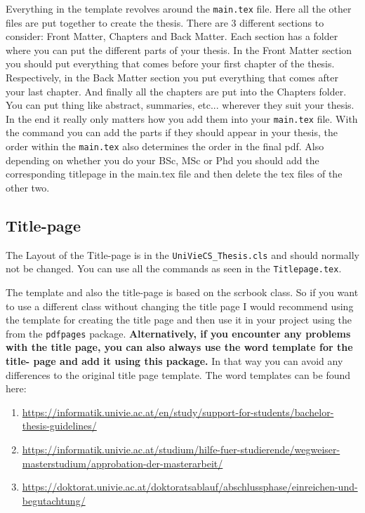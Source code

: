 Everything in the template revolves around the \verb|main.tex| file. Here all the other files are put together to create the thesis.
There are 3 different sections to consider: Front Matter, Chapters and Back Matter. Each section has a folder where you can put the different parts of your thesis. In the Front Matter section you should put everything that comes before your first chapter of the thesis. Respectively, in the Back Matter section you put everything that comes after your last chapter. And finally all the chapters are put into the Chapters folder. You can put thing like abstract, summaries, etc... wherever they suit your thesis. In the end it really only matters how you add them into your \verb|main.tex| file. With the \verb|| command you can add the parts if they should appear in your thesis, the order within the \verb|main.tex| also determines the order in the final pdf. Also depending on whether you do your BSc, MSc or Phd you should add the corresponding titlepage in the main.tex file and then delete the tex files of the other two.

\subsection{Title-page}
The Layout of the Title-page is in the \verb|UniVieCS_Thesis.cls| and should normally not be changed. You can use all the commands as seen in the \verb|Titlepage.tex|. 

The template and also the title-page is based on the scrbook class. So if you want to use a different class without changing the title page I would recommend using the template for creating the title page and then use it in your project using the 
\verb|| from the \verb|pdfpages| package. \textbf{Alternatively, if you encounter any problems with the title page, you can also always use the word template for the title- page and add it using this package.} In that way you can avoid any differences to the original title page template. The word templates can be found here:
\begin{enumerate}
    \item \url{https://informatik.univie.ac.at/en/study/support-for-students/bachelor-thesis-guidelines/}
    \item \url{https://informatik.univie.ac.at/studium/hilfe-fuer-studierende/wegweiser-masterstudium/approbation-der-masterarbeit/ }
    \item \url{https://doktorat.univie.ac.at/doktoratsablauf/abschlussphase/einreichen-und-begutachtung/}

\end{enumerate}

